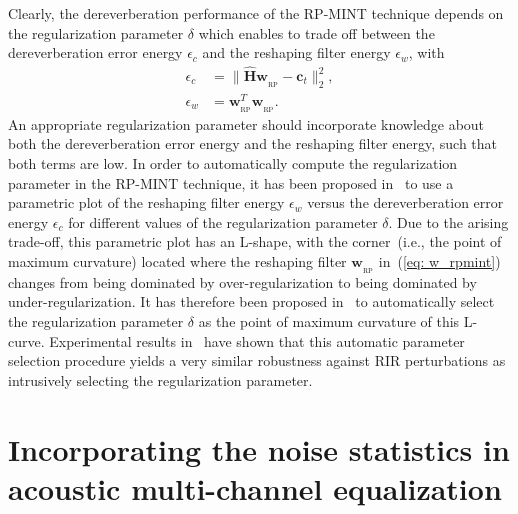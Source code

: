\documentclass{aes60i}
\begin{document}
\newline
Clearly, the dereverberation performance of the RP-MINT technique depends on the regularization parameter $\delta$ which enables to trade off between the dereverberation error energy $\epsilon_c$ and the reshaping filter energy $\epsilon_w$, with
\begin{align} 
\epsilon_c & = \|\hat{\mathbf{H}}\mathbf{w}_{_{\text{RP}}} -\mathbf{c}_t \|_2^2, \\
\epsilon_w & = \mathbf{w}_{_{\text{RP}}}^T\mathbf{w}_{_{\text{RP}}}^{}.
\end{align}
An appropriate regularization parameter should incorporate knowledge about both the dereverberation error energy and the reshaping filter energy, such that both terms are low.
In order to automatically compute the regularization parameter in the RP-MINT technique, it has been proposed in~\cite{Kodrasi_ITASLP_2013} to use a parametric plot of the reshaping filter energy $\epsilon_w$ versus the dereverberation error energy $\epsilon_c$ for different values of the regularization parameter $\delta$.
Due to the arising trade-off, this parametric plot has an L-shape, with the corner~(i.e., the point of maximum curvature) located where the reshaping filter $\mathbf{w}_{_{\text{RP}}}$ in~(\ref{eq: w_rpmint}) changes from being dominated by over-regularization to being dominated by under-regularization.
It has therefore been proposed in~\cite{Kodrasi_ITASLP_2013} to automatically select the regularization parameter $\delta$ as the point of maximum curvature of this L-curve.
Experimental results in~\cite{Kodrasi_ITASLP_2013} have shown that this automatic parameter selection procedure yields a very similar robustness against RIR perturbations as intrusively selecting the regularization parameter. 

\section{Incorporating the noise statistics in acoustic multi-channel equalization}
\label{sec: nr}
\end{document}
